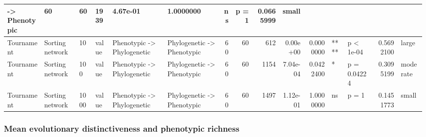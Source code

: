 \documentclass[]{book}
\begin{document}
\begin{table}
\begin{tabular}[t]{l|l|l|l|l|l|r|r|r|r|r|l|l|r|l}
    ->
Phenotypic & 60 & 60 & 1939 & 4.67e-01 & 1.0000000 & ns & p = 1 & 0.0665999 & small\\
\hline
Tournament & Sorting network & 10 & value & Phenotypic
    ->
Phylogenetic & Phylogenetic
    ->
Phenotypic & 60 & 60 & 612 & 0.00e+00 & 0.0000000 & **** & p < 1e-04 & 0.5692100 & large\\
\hline
Tournament & Sorting network & 100 & value & Phenotypic
    ->
Phylogenetic & Phylogenetic
    ->
Phenotypic & 60 & 60 & 1154 & 7.04e-04 & 0.0422400 & * & p = 0.04224 & 0.3095199 & moderate\\
\hline
Tournament & Sorting network & 1000 & value & Phenotypic
    ->
Phylogenetic & Phylogenetic
    ->
Phenotypic & 60 & 60 & 1497 & 1.12e-01 & 1.0000000 & ns & p = 1 & 0.1451773 & small\\
\hline
\end{tabular}
\end{table}

\hypertarget{mean-evolutionary-distinctiveness-and-phenotypic-richness-1}{%
\subsubsection{Mean evolutionary distinctiveness and phenotypic richness}\label{mean-evolutionary-distinctiveness-and-phenotypic-richness-1}}
\end{document}

